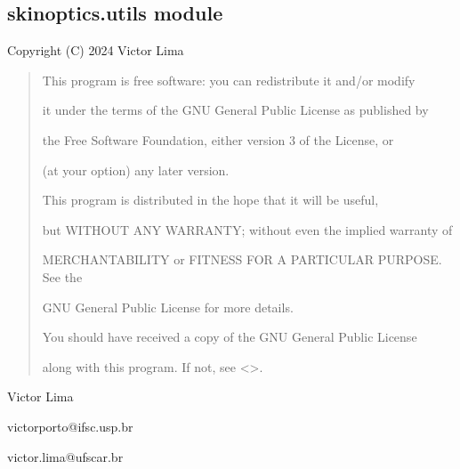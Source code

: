 \documentclass[letterpaper,10pt,english]{sphinxmanual}
\begin{document}
\subsection{skinoptics.utils module}
\label{\detokenize{01_utils:module-skinoptics.utils}}\label{\detokenize{01_utils:skinoptics-utils-module}}\label{\detokenize{01_utils::doc}}
\sphinxAtStartPar
Copyright (C) 2024 Victor Lima
\begin{quote}

\begin{DUlineblock}{0em}
\item[] This program is free software: you can redistribute it and/or modify
\item[] it under the terms of the GNU General Public License as published by
\item[] the Free Software Foundation, either version 3 of the License, or
\item[] (at your option) any later version.
\end{DUlineblock}

\begin{DUlineblock}{0em}
\item[] This program is distributed in the hope that it will be useful,
\item[] but WITHOUT ANY WARRANTY; without even the implied warranty of
\item[] MERCHANTABILITY or FITNESS FOR A PARTICULAR PURPOSE.  See the
\item[] GNU General Public License for more details.
\end{DUlineblock}

\begin{DUlineblock}{0em}
\item[] You should have received a copy of the GNU General Public License
\item[] along with this program.  If not, see \textless{}\textgreater{}.
\end{DUlineblock}
\end{quote}

\begin{DUlineblock}{0em}
\item[] Victor Lima
\item[] victorporto@ifsc.usp.br
\item[] victor.lima@ufscar.br
\end{DUlineblock}
\end{document}
